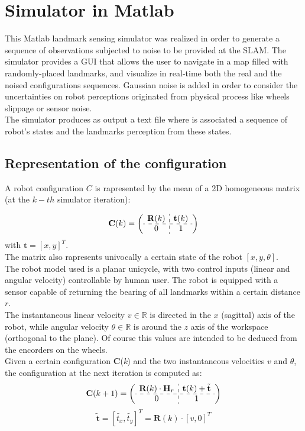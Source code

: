 \section{Simulator in Matlab}\label{sec:matlab_simulator}

This Matlab landmark sensing simulator was realized in order to generate a sequence of observations subjected to noise to be provided at the SLAM.
The simulator provides a GUI that allows the user to navigate in a map filled with randomly-placed landmarks, and visualize in real-time both the real 
and the noised configurations sequences. Gaussian noise is added in order to consider the uncertainties on robot perceptions originated from physical process
like wheels slippage or sensor noise.\\
The simulator produces as output a text file where is associated a sequence of robot's states and the landmarks perception from these states.

\subsection{Representation of the configuration}
A robot configuration $C$ is rapresented by the mean of a 2D homogeneous matrix (at the $k-th$ simulator iteration):

\[ 
\textbf{C}(k) = 
\left( \begin{array}{c:c}
  \textbf{R}(k)  & \textbf{t}(k) \\ \hdashline
  0 & 1  \\
\end{array} \right)
\]
with $\textbf{t} = [x,y]^T$.\\
The matrix also rapresents univocally a certain state of the robot $[x,y,\theta]$.
\\
The robot model used is a planar unicycle, with two control inputs (linear and angular velocity) controllable by human user.
The robot is equipped with a sensor capable of returning the bearing of all landmarks within a certain distance $r$.\\
The instantaneous linear velocity $v \in \mathbb{R}$ is directed in the $x$ (sagittal) axis of the robot, while angular velocity $\theta \in \mathbb{R}$ is
around the $z$ axis of the workspace (orthogonal to the plane). Of course this values are intended to be deduced from the encorders on the wheels.\\
Given a certain configuration $\textbf{C}$(\textit{k}) and the two instantaneous velocities $v$ and $\theta$, the configuration at the next iteration is computed as:\\
\vspace{1 cm}
\[ 
\textbf{C}(k+1) = 
\left( \begin{array}{c:c}
  \textbf{R}(k) \cdot \textbf{H}_r & \textbf{t}(k) + \tilde{\textbf{t}} \\ \hdashline
  0 & 1  \\
\end{array} \right)
\]
\[ 
\tilde{\textbf{t}} = [\tilde{t_x},\tilde{t_y}]^T = \textbf{R}(k) \cdot [v,0]^T
\]


